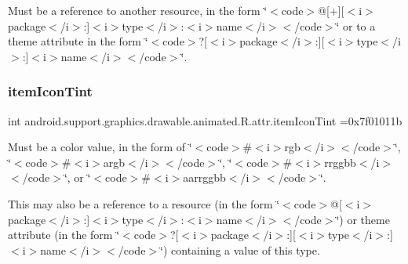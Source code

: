 Must be a reference to another resource, in the form \char`\"{}$<$code$>$@\mbox{[}+\mbox{]}\mbox{[}$<$i$>$package$<$/i$>$\+:\mbox{]}$<$i$>$type$<$/i$>$\+:$<$i$>$name$<$/i$>$$<$/code$>$\char`\"{} or to a theme attribute in the form \char`\"{}$<$code$>$?\mbox{[}$<$i$>$package$<$/i$>$\+:\mbox{]}\mbox{[}$<$i$>$type$<$/i$>$\+:\mbox{]}$<$i$>$name$<$/i$>$$<$/code$>$\char`\"{}. \mbox{\label{classandroid_1_1support_1_1graphics_1_1drawable_1_1animated_1_1R_1_1attr_a3a60443d6f62cfbc9aafbddb72ea0626}} 
\subsubsection{\texorpdfstring{item\+Icon\+Tint}{itemIconTint}}
{\footnotesize\ttfamily int android.\+support.\+graphics.\+drawable.\+animated.\+R.\+attr.\+item\+Icon\+Tint =0x7f01011b\hspace{0.3cm}{\ttfamily [static]}}

Must be a color value, in the form of \char`\"{}$<$code$>$\#$<$i$>$rgb$<$/i$>$$<$/code$>$\char`\"{}, \char`\"{}$<$code$>$\#$<$i$>$argb$<$/i$>$$<$/code$>$\char`\"{}, \char`\"{}$<$code$>$\#$<$i$>$rrggbb$<$/i$>$$<$/code$>$\char`\"{}, or \char`\"{}$<$code$>$\#$<$i$>$aarrggbb$<$/i$>$$<$/code$>$\char`\"{}. 

This may also be a reference to a resource (in the form \char`\"{}$<$code$>$@\mbox{[}$<$i$>$package$<$/i$>$\+:\mbox{]}$<$i$>$type$<$/i$>$\+:$<$i$>$name$<$/i$>$$<$/code$>$\char`\"{}) or theme attribute (in the form \char`\"{}$<$code$>$?\mbox{[}$<$i$>$package$<$/i$>$\+:\mbox{]}\mbox{[}$<$i$>$type$<$/i$>$\+:\mbox{]}$<$i$>$name$<$/i$>$$<$/code$>$\char`\"{}) containing a value of this type. \mbox{\label{classandroid_1_1support_1_1graphics_1_1drawable_1_1animated_1_1R_1_1attr_a62ed6d88a31437a2306540e5fadb6b19}} 
